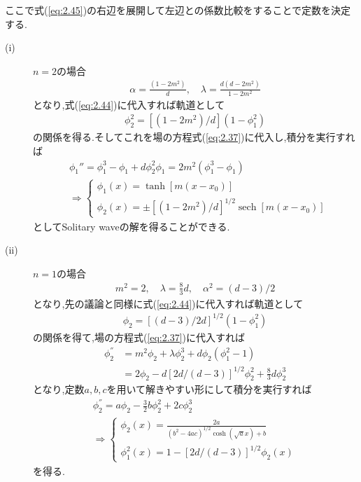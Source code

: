 \documentclass[dvipdfmx,11pt,a4paper,oneside,openany]{jsbook}
\begin{document}
ここで式(\ref{eq:2.45})の右辺を展開して左辺との係数比較をすることで定数を決定する.
\begin{description}
    \item[(i)] $n=2$の場合\\
          \begin{align}
              \alpha=\frac{\left(1-2 m^{2}\right)}{d}, \quad \lambda=\frac{d\left(d-2 m^{2}\right)}{1-2 m^{2}}
          \end{align}
          となり,式(\ref{eq:2.44})に代入すれば軌道として
          \begin{align*}
              \phi_2^2=\left[(1-2m^2)/d\right](1-\phi_1^2)
          \end{align*}
          の関係を得る.そしてこれを場の方程式(\ref{eq:2.37})に代入し,積分を実行すれば
          \begin{align}
               & \phi_1''=\phi_1^3-\phi_1+d\phi_2^2\phi_1=2m^2(\phi_1^3-\phi_1) \\
               & \Rightarrow
              \begin{cases}
                  \phi_{1}(x)=\tanh \left[m\left(x-x_{0}\right)\right] \\
                  \phi_{2}(x)=\pm\left[\left(1-2 m^{2}\right) / d\right]^{1 / 2} \operatorname{sech}\left[m\left(x-x_{0}\right)\right]
              \end{cases}\label{eq:2.48}
          \end{align}
          としてSolitary waveの解を得ることができる.
    \item[(ii)] $n=1$の場合\\
          \begin{align}
              m^{2}=2, \quad \lambda=\frac{8}{3} d, \quad \alpha^{2}=(d-3)/2
          \end{align}
          となり,先の議論と同様に式(\ref{eq:2.44})に代入すれば軌道として
          \begin{align*}
              \phi_{2}=[(d-3) / 2 d]^{1 / 2}\left(1-\phi_{1}^{2}\right)
          \end{align*}
          の関係を得て,場の方程式(\ref{eq:2.37})に代入すれば
          \begin{align}
              \phi_{2}^{''} & =m^{2} \phi_{2}+\lambda \phi_{2}^{3}+d \phi_{2}\left(\phi_{1}^{2}-1\right)\nonumber \\
                            & =2 \phi_{2}-d[2 d /(d-3)]^{1 / 2} \phi_{2}^{2}+\frac{8}{3} d \phi_{2}^{3}
          \end{align}
          となり,定数$a,b,c$を用いて解きやすい形にして積分を実行すれば
          \begin{align}
              \phi_{2}^{''}=a \phi_{2}-\frac{3}{2} b \phi_{2}^{2}+2 c \phi_{2}^{3} \\
              \Rightarrow
              \begin{cases}
                  \phi_{2}(x)=\frac{2 a}{\left(b^{2}-4 a c\right)^{1 / 2} \cosh (\sqrt{a} x)+b} \\
                  \phi_{1}^{2}(x)=1-[2 d /(d-3)]^{1 / 2} \phi_{2}(x)
              \end{cases}\label{eq:2.52}
          \end{align}
          を得る.
\end{description}
\end{document}
